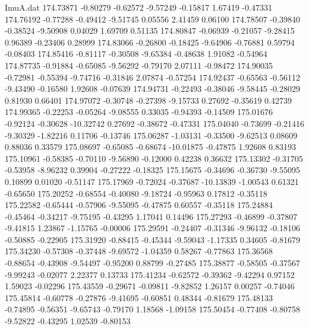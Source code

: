 \begin{filecontents}{ImuA.dat}
 174.73871   -0.80279   -0.62572   -9.57249   -0.15817    1.67419   -0.47331
 174.76192   -0.77288   -0.49412   -9.51745    0.05556    2.41459    0.06100
 174.78507   -0.39840   -0.38524   -9.50908    0.04029    1.69709    0.51135
 174.80847   -0.06939   -0.21057   -9.28415    0.96389   -0.23406    0.28999
 174.83066   -0.26800   -0.18425   -9.64906   -0.76881    0.59794   -0.08403
 174.85416   -0.81117   -0.30508   -9.65384   -0.48638    1.91082   -0.54964
 174.87735   -0.91884   -0.65085   -9.56292   -0.79170    2.07111   -0.98472
 174.90035   -0.72981   -0.55394   -9.74716   -0.31846    2.07874   -0.57254
 174.92437   -0.65563   -0.56112   -9.43490   -0.16580    1.92608   -0.07639
 174.94731   -0.22493   -0.38046   -9.58445   -0.28029    0.81930    0.66401
 174.97072   -0.30748   -0.27398   -9.15733    0.27692   -0.35619    0.42739
 174.99365   -0.22253   -0.05264   -9.08555    0.33035   -0.94393   -0.14509
 175.01676   -0.92124   -0.30628  -10.32742    0.27692   -0.38672   -0.47331
 175.04040   -0.73699   -0.21416   -9.30329   -1.82216    0.11706   -0.13746
 175.06287   -1.03131   -0.33500   -9.62513    0.08609    0.88036    0.33579
 175.08697   -0.65085   -0.68674  -10.01875   -0.47875    1.92608    0.83193
 175.10961   -0.58385   -0.70110   -9.56890   -0.12000    0.42238    0.36632
 175.13302   -0.31705   -0.53958   -8.96232    0.39904   -0.27222   -0.18325
 175.15675   -0.34696   -0.36730   -9.55095    0.10899    0.01020   -0.51147
 175.17969   -0.72024   -0.37687  -10.13839   -1.00543    0.61321   -0.65650
 175.20252   -0.68554   -0.40080   -9.18724   -0.95963    0.17812   -0.35118
 175.22582   -0.65444   -0.57906   -9.55095   -0.47875    0.60557   -0.35118
 175.24884   -0.45464   -0.34217   -9.75195   -0.43295    1.17041    0.14496
 175.27293   -0.46899   -0.37807   -9.41815    1.23867   -1.15765   -0.00006
 175.29591   -0.24407   -0.31346   -9.96132   -0.18106   -0.50885   -0.22905
 175.31920   -0.88415   -0.45344   -9.59043   -1.17335    0.34605   -0.81679
 175.34230   -0.57308   -0.37448   -9.69572   -1.04359    0.58267   -0.77863
 175.36568   -0.88654   -0.43908   -9.54497   -0.95200    0.88799   -0.27485
 175.38877   -0.58505   -0.37567   -9.99243   -0.02077    2.22377    0.13733
 175.41234   -0.62572   -0.39362   -9.42294    0.97152    1.59023   -0.02296
 175.43559   -0.29671   -0.09811   -9.82852    1.26157    0.00257   -0.74046
 175.45814   -0.60778   -0.27876   -9.41695   -0.60851    0.48344   -0.81679
 175.48133   -0.74895   -0.56351   -9.65743   -0.79170    1.18568   -1.09158
 175.50454   -0.77408   -0.80758   -9.52822   -0.43295    1.02539   -0.80153

\end{filecontents}
